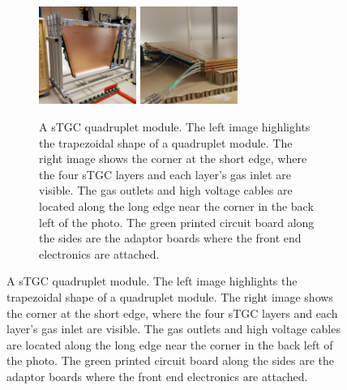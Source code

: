 \newpage
\thispagestyle{empty}
\begin{figure}
\centering
\begin{subfigure}{\textwidth}
  \centering
  \includegraphics[width=0.35\textwidth]{figures/stgc_quad_cart.jpg}
  \includegraphics[width=0.35\textwidth]{figures/stgc_quad_inlet_corner.jpg}
  \caption{A sTGC quadruplet module. The left image highlights the trapezoidal shape of a quadruplet module. The right image shows the corner at the short edge, where the four sTGC layers and each layer's gas inlet are visible. The gas outlets and high voltage cables are located along the long edge near the corner in the back left of the photo. The green printed circuit board along the sides are the adaptor boards where the front end electronics are attached.}
  \label{fig:stgc_quad}
\end{subfigure}

\smallskip


\end{figure}

